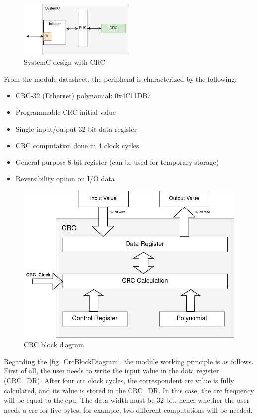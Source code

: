 \begin{figure}[H]
	\centering
	\includegraphics[width=0.5\textwidth]{Images/SystemCdesign_CRC.png}
	\caption{SystemC design with CRC}
	\label{fig_SystemCdesign_CRC}
\end{figure}

From the module datasheet, the peripheral is characterized by the following:  

\begin{itemize}
	\item CRC-32 (Ethernet) polynomial: 0x4C11DB7
	\item Programmable CRC initial value
	\item Single input/output 32-bit data register
	\item CRC computation done in 4 clock cycles 
	\item General-purpose 8-bit register (can be used for temporary storage)
	\item Reversibility option on I/O data
\end{itemize}

\begin{figure}[]
	\centering
 	\includegraphics[width=0.55\linewidth]{Images/CrcBlockDiagram.png}
 	\caption{CRC block diagram}
	 \label{fig_CrcBlockDiagram}
\end{figure}


Regarding the \autoref{fig_CrcBlockDiagram}, the module working principle is as follows. First of all, the user needs to write the input value 
in the data register (CRC\_DR). After four \gls{crc} clock cycles, the correspondent \gls{crc} value is fully calculated, and its
value is stored in the CRC\_DR. In this case, the \gls{crc} frequency will be equal to the \gls{cpu}. The data width must be 32-bit, 
hence whether the user needs a \gls{crc} for five bytes, for example, two different computations will be needed. 


